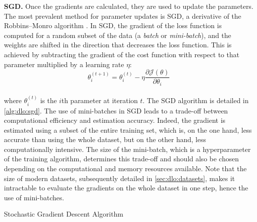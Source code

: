 \noindent \textbf{\acl{SGD}.} Once the gradients are calculated, they are used
to update the parameters. The most prevalent method for parameter updates is
\acf{SGD}, a derivative of the Robbins–Monro algorithm
\cite{robbins1951stochastic}. In \ac{SGD}, the gradient of the loss function is
computed for a random subset of the data (a \emph{batch} or \emph{mini-batch}),
and the weights are shifted in the direction that decreases the loss function.
This is achieved by subtracting the gradient of the cost function with respect
to that parameter multiplied by a learning rate $\eta$:\\

\begin{equation}
\label{eqn:dlo:sgd_update}
\theta_i^{(t+1)} = \theta_i^{(t)} - \eta \frac{\partial \mathcal{J}(\theta)}{\partial \theta_i}
\end{equation}\\

\noindent where $\theta_i^{(t)}$ is the $i$th parameter at iteration $t$. The
\ac{SGD} algorithm is detailed in \cref{alg:dlo:sgd}. The use of mini-batches in
\ac{SGD} leads to a trade-off between computational efficiency and estimation
accuracy. Indeed, the gradient is estimated using a subset of the entire
training set, which is, on the one hand, less accurate than using the whole
dataset, but on the other hand, less computationally intensive. The size of the
mini-batch, which is a hyperparameter of the training algorithm, determines this
trade-off and should also be chosen depending on the computational and memory
resources available. Note that the size of modern datasets, subsequently
detailed in \cref{sec:dlo:datasets}, makes it intractable to evaluate the
gradients on the whole dataset in one step, hence the use of mini-batches.\\

\begin{algorithm}
  \caption{Stochastic Gradient Descent Algorithm}
  \label{alg:dlo:sgd}
  \begin{algorithmic}
      
      \ENDWHILE {}
  \end{algorithmic}
\end{algorithm}


